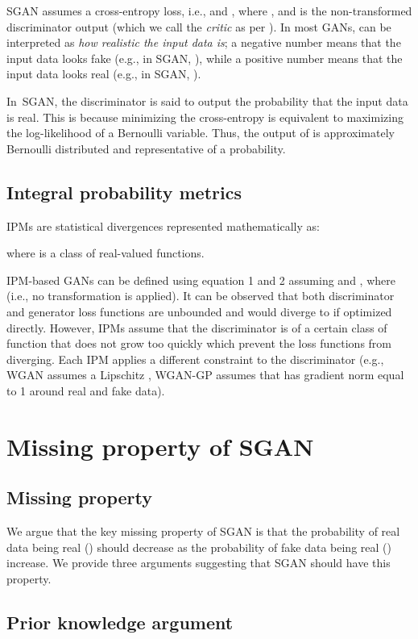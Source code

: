 \documentclass{article}
\begin{document}
SGAN assumes a cross-entropy loss, i.e.,  and , where , and  is the non-transformed discriminator output (which we call the \textit{critic} as per \citet{WGAN}). In most GANs,  can be interpreted as \textit{how realistic the input data is}; a negative number means that the input data looks fake (e.g., in SGAN, ), while a positive number means that the input data looks real (e.g., in SGAN, ).

In SGAN, the discriminator is said to output the probability that the input data is real. This is because minimizing the cross-entropy is equivalent to maximizing the log-likelihood of a Bernoulli variable. Thus, the output of  is approximately Bernoulli distributed and representative of a probability.

\subsection{Integral probability metrics}

IPMs are statistical divergences represented mathematically as:

where  is a class of real-valued functions. 

IPM-based GANs can be defined using equation 1 and 2 assuming  and , where  (i.e., no transformation is applied). It can be observed that both discriminator and generator loss functions are unbounded and would diverge to  if optimized directly. However, IPMs assume that the discriminator is of a certain class of function that does not grow too quickly which prevent the loss functions from diverging. Each IPM applies a different constraint to the discriminator (e.g., WGAN assumes a Lipschitz , WGAN-GP assumes that  has gradient norm equal to 1 around real and fake data).

\section{Missing property of SGAN}

\subsection{Missing property}

We argue that the key missing property of SGAN is that the probability of real data being real () should decrease as the probability of fake data being real () increase. We provide three arguments suggesting that SGAN should have this property.

\subsection{Prior knowledge argument}
\end{document}
